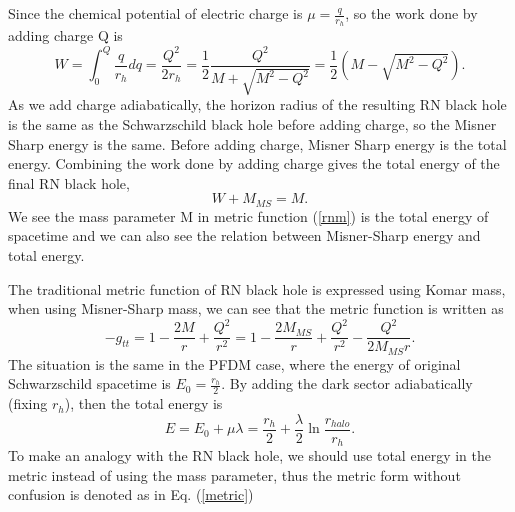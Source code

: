 \documentclass[a4paper,11pt]{article}
\begin{document}
Since the chemical potential of electric charge is $\mu=\frac{q}{r_{h}}$, so the work done by adding charge Q is 
\begin{equation}
W=\int_{0}^{Q} \frac{q}{r_{h}}dq=\frac{Q^{2}}{2r_{h}}=\frac{1}{2}\frac{Q^{2}}{M+\sqrt{M^{2}-Q^{2}}}=\frac{1}{2}(M-\sqrt{M^{2}-Q^{2}}).
\end{equation}
As we add charge adiabatically, the horizon radius of the resulting RN black hole is the same as the Schwarzschild black hole before adding charge, so the Misner Sharp energy is the same. Before adding charge, Misner Sharp energy is the total energy. Combining the work done by adding charge gives the total energy of the final RN black hole,
\begin{equation}
W+M_{MS}=M.
\end{equation}
We see the mass parameter M in metric function (\ref{rnm}) is the total energy of spacetime and we can also see the relation between Misner-Sharp energy and total energy. 


The traditional metric function of RN black hole is expressed using Komar mass, when using Misner-Sharp mass, we can see that the metric function is written as 
\begin{equation}
-g_{tt}=1-\frac{2M}{r}+\frac{Q^{2}}{r^{2}}=1-\frac{2M_{MS}}{r}+\frac{Q^{2}}{r^{2}}-\frac{Q^{2}}{2M_{MS}r}.
\end{equation}
The situation is the same in the PFDM case, where the energy of original Schwarzschild spacetime  is $E_{0}=\frac{r_{h}}{2}$. By adding the dark sector adiabatically (fixing $r_{h}$), then the total energy is 
\begin{equation}
E=E_{0}+\mu \lambda=\frac{r_{h}}{2}+\frac{\lambda}{2} \ln \frac{r_{halo}}{r_{h}}.
\end{equation}
To make an analogy with the RN black hole, we should use total energy in the metric instead of using the mass parameter, thus the metric form without confusion is denoted as in Eq. (\ref{metric})
\end{document}
